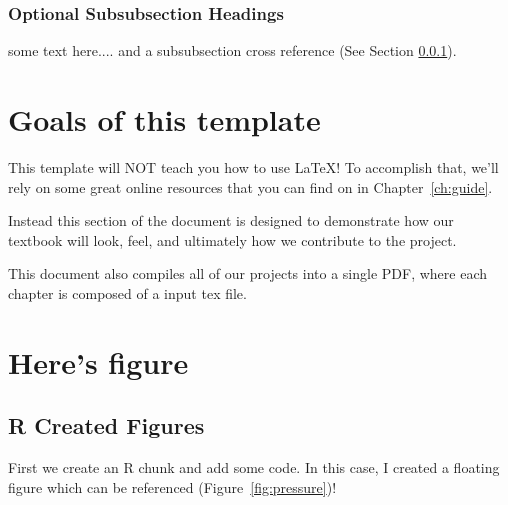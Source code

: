 \documentclass{book}\usepackage{knitr}
\begin{document}
\subsubsection{Optional Subsubsection Headings}\label{subsub:optionalsubsub} %

some text here.... and a subsubsection cross reference (See Section \ref{subsub:optionalsubsub}).

\section{Goals of this template}

This template will NOT teach you how to use \LaTeX! To accomplish that, we'll rely on some great online resources that you can find on in Chapter~\ref{ch:guide}. 

Instead this section of the document is designed to demonstrate how our textbook will look, feel, and ultimately how we contribute to the project.

This document also compiles all of our projects into a single PDF, where each chapter is composed of a input tex file.

\section{Here's figure}

\subsection{R Created Figures}

First we create an R chunk and add some code. In this case, I created a floating figure which can be referenced (Figure~\ref{fig:pressure})!  
\end{document}
